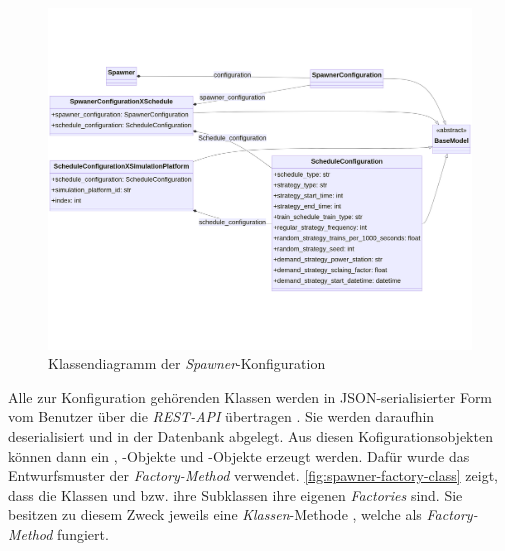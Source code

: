 \begin{figure}[!ht]
	\centering
	\includegraphics[width=1.0\linewidth]{images/diagrams/spawner-config-class.png}
	\caption{Klassendiagramm der \emph{Spawner}-Konfiguration}
	\label{fig:spawner-config-class}
\end{figure}

Alle zur Konfiguration gehörenden Klassen werden in JSON-serialisierter Form vom Benutzer über die \emph{REST-API} übertragen \cite{kamp_architektur_2023}. Sie werden daraufhin deserialisiert und in der Datenbank abgelegt. Aus diesen Kofigurationsobjekten können dann ein , -Objekte und -Objekte erzeugt werden. Dafür wurde das Entwurfsmuster der \emph{Factory-Method} verwendet. \autoref{fig:spawner-factory-class} zeigt, dass die Klassen  und  bzw. ihre Subklassen ihre eigenen \emph{Factories} sind. Sie besitzen zu diesem Zweck jeweils eine \emph{Klassen}-Methode , welche als \emph{Factory-Method} fungiert.

